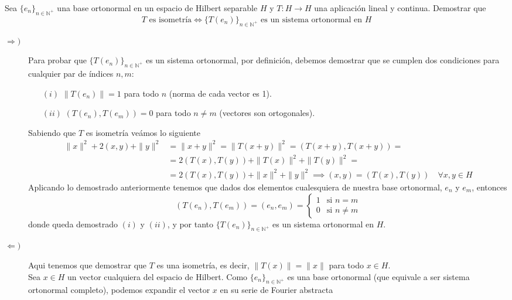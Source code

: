 \begin{ejercicio}
    Sea $\{e_n\}_{n \in \mathbb{N}^+}$ una base ortonormal en un espacio de Hilbert separable $H$ y $T: H \longrightarrow H$ una aplicación lineal y continua. Demostrar que 
    \begin{equation*}
        T \text{ es isometría} \iff \{T(e_n)\}_{n \in \mathbb{N}^+} \text{ es un sistema ortonormal en } H
    \end{equation*}
    \begin{description}
        \item[$\Longrightarrow)$] Para probar que $\{T(e_n)\}_{n \in \mathbb{N}^+}$ es un sistema ortonormal, por definición, debemos demostrar que se cumplen dos condiciones para cualquier par de índices $n, m$:
        \begin{itemize}
            \item[$(i)$] $\|T(e_n)\| = 1$ para todo $n$ (norma de cada vector es 1).
            \item[$(ii)$] $( T(e_n), T(e_m) ) = 0$ para todo $n \neq m$ (vectores son ortogonales).
        \end{itemize}
        Sabiendo que $T$ es isometría veámos lo siguiente
        \begin{align*}
            \|x\|^2+2(x,y)+\|y\|^2 &= \|x+y\|^2 = \|T(x+y)\|^2 = (T(x+y), T(x+y)) =\\
            &= 2(T(x), T(y)) + \|T(x)\|^2 + \|T(y)\|^2 =\\
            &= 2(T(x), T(y)) + \|x\|^2 + \|y\|^2\implies (x,y) = (T(x), T(y)) \quad \forall x,y \in H
        \end{align*}
        Aplicando lo demostrado anteriormente tenemos que dados dos elementos cualesquiera de nuestra base ortonormal, $e_n$ y $e_m$, entonces 
        \begin{equation*}
            (T(e_n), T(e_m)) = (e_n, e_m) = 
            \begin{cases}
                1 & \text{si } n = m \\
                0 & \text{si } n \neq m
            \end{cases}
        \end{equation*}
        donde queda demostrado $(i)$ y $(ii)$, y por tanto $\{T(e_n)\}_{n \in \mathbb{N}^+}$ es un sistema ortonormal en $H$.
        
        \item[$\Longleftarrow)$] Aqui tenemos que demostrar que $T$ es una isometría, es decir, $\|T(x)\| = \|x\|$ para todo $x \in H$. \\
        \noindent
        Sea $x \in H$ un vector cualquiera del espacio de Hilbert. Como $\{e_n\}_{n \in \mathbb{N}^+}$ es una base ortonormal (que equivale a ser sistema ortonormal completo), podemos expandir el vector $x$ en su serie de Fourier abstracta
        

\end{description}
\end{ejercicio}
